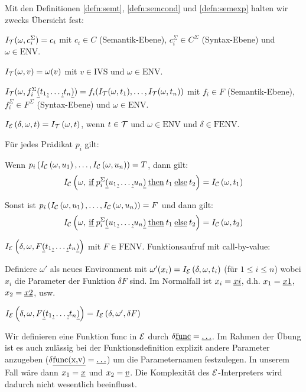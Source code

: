 \begin{anm}
Mit den Definitionen \ref{defn:semt}, \ref{defn:semcond} und \ref{defn:semexp} halten wir zwecks Übersicht fest:
\begin{\whichenum}
\item $I_{\mathcal{T}}(\omega,c^{\Sigma}_i)=c_i$ mit $c_i \in C$ (Semantik-Ebene), $c^{\Sigma}_i \in C^{\Sigma}$ (Syntax-Ebene) und $\omega \in \text{ENV}$.
\item $I_{\mathcal{T}}(\omega,v)=\omega(v)$ mit $v \in \text{IVS}$ und $\omega \in \text{ENV}$.
\item $I_{\mathcal{T}}(\omega,f^{\Sigma}_i\underline{(}t_1\underline{,}\ldots\underline{,}t_n\underline{)})=f_i(I_{\mathcal{T}}(\omega,t_1),\ldots,I_{\mathcal{T}}(\omega,t_n))$ mit $f_i \in F$ (Semantik-Ebene), $f^{\Sigma}_i \in F^{\Sigma}$ (Syntax-Ebene) und $\omega \in \text{ENV}$.
\item $I_{\mathcal{E}}\left(\delta,\omega,t\right) = I_{\mathcal{T}}\left(\omega,t\right)$, wenn $t \in \mathcal{T}$ und $\omega \in \text{ENV}$ und $\delta \in \text{FENV}$.
\item Für jedes Prädikat $p_i$ gilt:
\begin{\whichitem}
\item Wenn $p_i\left(I_{\mathcal{C}}\left(\omega,u_1\right),\ldots,I_{\mathcal{C}}\left(\omega,u_n\right)\right)=T$, dann gilt:
\[I_{\mathcal{C}}\left(\omega,{\operatorname*{\:\underline{if}\:}} p_{i}^{\Sigma} \underline{(} u_1\underline{,}\ldots\underline{,}u_n\underline{)}{\operatorname*{\:\underline{then}\:}} t_1 {\operatorname*{\:\underline{else}\:}} t_2\right)=I_{\mathcal{C}}\left(\omega,t_1\right)\]
\item Sonst ist $p_i\left(I_{\mathcal{C}}\left(\omega,u_1\right),\ldots,I_{\mathcal{C}}\left(\omega,u_n\right)\right)=F$ und dann gilt:
\[I_{\mathcal{C}}\left(\omega,{\operatorname*{\:\underline{if}\:}} p_{i}^{\Sigma} \underline{(} u_1\underline{,}\ldots\underline{,}u_n\underline{)}{\operatorname*{\:\underline{then}\:}} t_1 {\operatorname*{\:\underline{else}\:}} t_2\right)=I_{\mathcal{C}}\left(\omega,t_2\right)\]
\end{\whichitem}
\item $I_{\mathcal{E}}\left(\delta,\omega,F\underline{(}t_1\underline{,}\ldots\underline{,}t_n\underline{)}\right)$ mit $F \in \text{FENV}$. Funktionsaufruf mit call-by-value:
\begin{\whichenum}
\item Definiere $\omega'$ als neues Environment mit $\omega'(x_i)=I_{\mathcal{E}}\left(\delta,\omega,t_i\right)$ (für $1 \leq i \leq n$) wobei $x_i$
die Parameter der Funktion $\delta F$ sind. Im Normalfall ist $x_i=\underline{xi}$, d.h. $x_1=\underline{x1}$, $x_2=\underline{x2}$, usw.
\item $I_{\mathcal{E}}\left(\delta,\omega,F\underline{(}t_1\underline{,}\ldots\underline{,}t_n\underline{)}\right)=I_{\mathcal{E}}\left(\delta,\omega',\delta F\right)$
\end{\whichenum}
\end{\whichenum}
\end{anm}

Wir definieren eine Funktion \u{func} in $\mathcal{E}$ durch $\delta\text{\underline{func}}=\underline{\ldots}$.
Im Rahmen der Übung ist es auch zulässig bei der Funktionsdefinition explizit andere Parameter anzugeben ($\delta\text{\underline{func(x,v)}}=\underline{\ldots}$)
um die Parameternamen festzulegen. In unserem Fall wäre dann $x_1 = \underline{x}$ und $x_2 = \underline{v}$.
Die Komplexität des $\mathcal{E}$-Interpreters wird dadurch nicht wesentlich beeinflusst.

